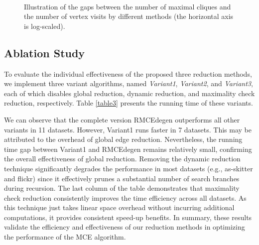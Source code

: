 \documentclass[sigconf, nonacm]{acmart}
\begin{document}
\begin{figure*}[ttbp]
\vspace{-0.15in}
\centering
{}
\hfil
{} \\
\vspace{-0.1in}
\hfil
{}
\vspace{-0.1in}
\caption{Illustration of the %
gaps between the number of maximal cliques and the number of vertex visits by different methods (the horizontal axis is log-scaled).}
\label{neweval}
\vspace{-0.1in}
\end{figure*}

\subsection{Ablation Study}

To evaluate the individual effectiveness of the proposed three reduction methods, we implement three variant algorithms, named \textit{Variant1}, \textit{Variant2}, and \textit{Variant3}, each of which disables global reduction, dynamic reduction, and maximality check reduction, respectively. Table \ref{table3} presents the running time of these variants. %

We can observe that the complete version RMCEdegen outperforms all other variants in 11 datasets. However, Variant1 runs faster in 7 datasets. This may be attributed to the overhead of global edge reduction. Nevertheless, the running time gap between Variant1 and RMCEdegen remains relatively small, confirming the overall effectiveness of global reduction.
Removing the dynamic reduction technique significantly degrades the performance in most datasets (e.g., as-skitter and flickr) since it effectively prunes a substantial number of search branches during recursion. The last column of the table demonstrates that maximality check reduction consistently improves the time efficiency across all datasets. As this technique just %
takes linear space overhead 
without incurring additional computations, it provides consistent speed-up benefits.
In summary, these results validate the efficiency and effectiveness of our reduction methods in optimizing the performance of the MCE algorithm. %
\end{document}
